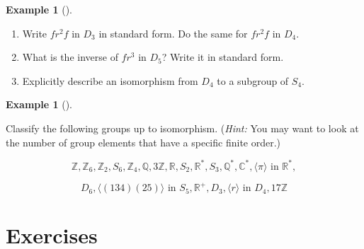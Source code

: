 \documentclass[10pt,]{book}
\theoremstyle{plain}
\theoremstyle{definition}
\theoremstyle{definition}
\theoremstyle{definition}
\newtheorem{example}[theorem]{Example}
\theoremstyle{definition}
\numberwithin{equation}{section}
\def\Z{\mathbb{Z}}
\def\R{\mathbb{R}}
\def\Q{\mathbb{Q}}
\def\C{\mathbb{C}}
\begin{document}
\begin{example}[]\label{example-63}
\leavevmode%
\begin{enumerate}
\item\hypertarget{li-357}{}
            Write \(fr^2f\) in \(D_3\) in standard form.  Do the same for \(fr^2f\) in \(D_4\).
\item\hypertarget{li-358}{}
            What is the inverse of \(fr^3\) in \(D_5\)?  Write it in standard form.
\item\hypertarget{li-359}{}
            Explicitly describe an isomorphism from \(D_4\) to a subgroup of \(S_4\).
\end{enumerate}
\end{example}
\begin{example}[]\label{example-64}

        Classify the following groups up to isomorphism. (\emph{Hint:}
        You may want to look at the number of group elements that have
        a specific finite order.)

%
\begin{equation*}
\Z, \Z_6, \Z_2, S_6, \Z_4, \Q, 3\Z, \R, S_2, \R^*, S_3,\Q^*, \C^*, \langle \pi\rangle \text{ in } \R^*,
\end{equation*}

%
\begin{equation*}
 D_6, 
\langle (134)(25)\rangle \text{ in } S_5, \R^+, D_3, \langle r \rangle \text{ in } D_4, 17\Z
\end{equation*}

\end{example}
\typeout{************************************************}
\typeout{************************************************}
\section[{Exercises}]{Exercises}\label{exercises-7}
\end{document}
